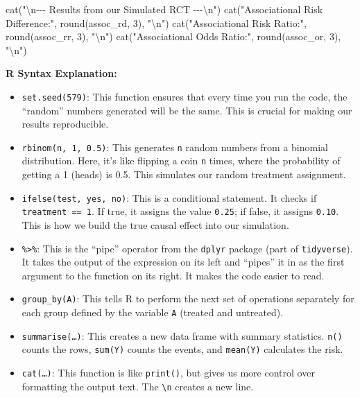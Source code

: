 \documentclass[
  10pt,
  letterpaper,
  DIV=11,
  numbers=noendperiod]{scrartcl}
\newenvironment{Shaded}{\begin{snugshade}}{\end{snugshade}}
\newcommand{\DecValTok}[1]{\textcolor[rgb]{0.68,0.00,0.00}{#1}}
\newcommand{\FunctionTok}[1]{\textcolor[rgb]{0.28,0.35,0.67}{#1}}
\newcommand{\NormalTok}[1]{\textcolor[rgb]{0.00,0.23,0.31}{#1}}
\newcommand{\SpecialCharTok}[1]{\textcolor[rgb]{0.37,0.37,0.37}{#1}}
\newcommand{\StringTok}[1]{\textcolor[rgb]{0.13,0.47,0.30}{#1}}
\providecommand{\tightlist}{%
  \setlength{\itemsep}{0pt}\setlength{\parskip}{0pt}}
\begin{document}
\begin{Shaded}
\begin{Highlighting}[]
\FunctionTok{cat}\NormalTok{(}\StringTok{"}\SpecialCharTok{\textbackslash{}n}\StringTok{{-}{-}{-} Results from our Simulated RCT {-}{-}{-}}\SpecialCharTok{\textbackslash{}n}\StringTok{"}\NormalTok{)}
\FunctionTok{cat}\NormalTok{(}\StringTok{"Associational Risk Difference:"}\NormalTok{, }\FunctionTok{round}\NormalTok{(assoc\_rd, }\DecValTok{3}\NormalTok{), }\StringTok{"}\SpecialCharTok{\textbackslash{}n}\StringTok{"}\NormalTok{)}
\FunctionTok{cat}\NormalTok{(}\StringTok{"Associational Risk Ratio:"}\NormalTok{, }\FunctionTok{round}\NormalTok{(assoc\_rr, }\DecValTok{3}\NormalTok{), }\StringTok{"}\SpecialCharTok{\textbackslash{}n}\StringTok{"}\NormalTok{)}
\FunctionTok{cat}\NormalTok{(}\StringTok{"Associational Odds Ratio:"}\NormalTok{, }\FunctionTok{round}\NormalTok{(assoc\_or, }\DecValTok{3}\NormalTok{), }\StringTok{"}\SpecialCharTok{\textbackslash{}n}\StringTok{"}\NormalTok{)}
\end{Highlighting}
\end{Shaded}

\textbf{R Syntax Explanation:}

\begin{itemize}
\tightlist
\item
  \texttt{set.seed(579)}: This function ensures that every time you run
  the code, the ``random'' numbers generated will be the same. This is
  crucial for making our results reproducible.
\item
  \texttt{rbinom(n,\ 1,\ 0.5)}: This generates \texttt{n} random numbers
  from a binomial distribution. Here, it's like flipping a coin
  \texttt{n} times, where the probability of getting a 1 (heads) is 0.5.
  This simulates our random treatment assignment.
\item
  \texttt{ifelse(test,\ yes,\ no)}: This is a conditional statement. It
  checks if \texttt{treatment\ ==\ 1}. If true, it assigns the value
  \texttt{0.25}; if false, it assigns \texttt{0.10}. This is how we
  build the true causal effect into our simulation.
\item
  \texttt{\%\textgreater{}\%}: This is the ``pipe'' operator from the
  \texttt{dplyr} package (part of \texttt{tidyverse}). It takes the
  output of the expression on its left and ``pipes'' it in as the first
  argument to the function on its right. It makes the code easier to
  read.
\item
  \texttt{group\_by(A)}: This tells R to perform the next set of
  operations separately for each group defined by the variable
  \texttt{A} (treated and untreated).
\item
  \texttt{summarise(…)}: This creates a new data frame with summary
  statistics. \texttt{n()} counts the rows, \texttt{sum(Y)} counts the
  events, and \texttt{mean(Y)} calculates the risk.
\item
  \texttt{cat(…)}: This function is like \texttt{print()}, but gives us
  more control over formatting the output text. The
  \texttt{\textbackslash{}n} creates a new line.
\end{itemize}
\end{document}
